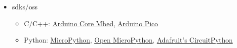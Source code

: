 \begin{frame}
\begin{itemize}
\begin{itemize}
              \end{itemize}
        \item \aclp{sdk}/\aclp{os}
              \begin{itemize}
                  \item C/C++: \href{https://github.com/arduino/ArduinoCore-mbed}{Arduino\textregistered{} Core Mbed}, \href{https://github.com/earlephilhower/arduino-pico}{Arduino\textregistered{} Pico}
                  \item Python: \href{https://micropython.org/download/ARDUINO\_NANO\_RP2040\_CONNECT/}{MicroPython}, \href{https://github.com/openmv/openmv/releases}{Open MicroPython}, \href{https://circuitpython.org/board/arduino\_nano\_rp2040\_connect/}{Adafruit's CircuitPython}
              \end{itemize}
    \end{itemize}
\end{frame}